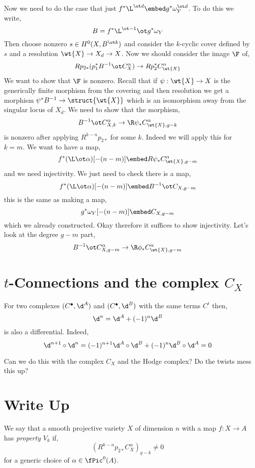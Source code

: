 \documentclass[12pt]{article}
\begin{document}
Now we need to do the case that just $f^* \L^{\ot d} \embed g^* \omega_Y^{\ot d}$. To do this we write,
\[ B = f^* \L^{\ot -1} \ot g^* \omega_Y \]
Then choose nonzero $s \in H^0(X, B^{\ot k})$ and consider the $k$-cyclic cover defined by $s$ and a resolution $\wt{X} \to X_d \to X$. Now we should consider the image $\F$ of,
\[ R p_{2*} (p_1^* B^{-1} \ot C_X^\alpha) \to R p_2^* C^\alpha_{\wt{X}} \]
We want to show that $\F$ is nonzero. Recall that if $\psi : \wt{X} \to X$ is the generically finite morphism from the covering and then resolution we get a morphism $\psi^{*} B^{-1} \to \struct{\wt{X}}$ which is an isomorphism away from the singular locus of $X_d$. We need to show that the morphism,
\[ B^{-1} \ot C_{X, k}^\alpha \to \R \psi_* C^\alpha_{\wt{X}, g-k} \]
is nonzero after applying $R^{k-n} p_{2*}$ for some $k$. Indeed we will apply this for $k = m$. We want to have a map,
\[ f^* (\L \ot \alpha)[-(n-m)] \embed R \psi_* C^\alpha_{\wt{X}, g-m} \]
and we need injectivity. We just need to check there is a map,
\[ f^* (\L \ot \alpha)[-(n-m)] \embed B^{-1} \ot C_{X, g-m} \]
this is the same as making a map,
\[ g^* \omega_Y [-(n-m)] \embed C_{X, g-m} \]
which we already constructed. Okay therefore it suffices to show injectivity. Let's look at the degree $g-m$ part,
\[ B^{-1} \ot C_{X, g-m}^\alpha \to \R \phi_* C^\alpha_{\wt{X}, g-m} \]

\section{$t$-Connections and the complex $C_X$}

For two complexes $(C^\bullet, \d^A)$ and $(C^\bullet, \d^B)$ with the same terms $C^i$ then,
\[ \d^n = \d^A + (-1)^n \d^B \]
is also a differential. Indeed,
\[ \d^{n+1} \circ \d^n = (-1)^{n+1} \d^A \circ \d^B + (-1)^{n} \d^B \circ \d^A = 0 \]

Can we do this with the complex $C_X$ and the Hodge complex? Do the twists mess this up?

\section{Write Up}

\begin{defn}
We say that a smooth projective variety $X$ of dimension $n$ with a map $f : X \to A$ has \textit{property $V_k$} if,
\[ (R^{k-n} p_{2*} C_X^\alpha)_{g-k} \neq 0 \]
for a generic choice of $\alpha \in \fPic^0(A)$.
\end{defn}
\end{document}
